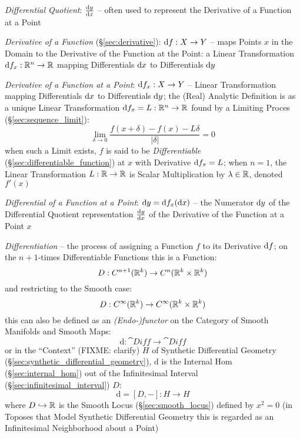 \emph{Differential Quotient}: $\frac{\mathrm{d}y}{\mathrm{d}x}$ -- often used to represent the
Derivative of a Function at a Point

\emph{Derivative of a Function} (\S\ref{sec:derivative}): $\mathrm{d}f : X
\rightarrow Y$ -- maps Points $x$ in the Domain to the Derivative of the
Function at the Point: a Linear Transformation
$\mathrm{d}f_x : \mathbb{R}^n \rightarrow \mathbb{R}$ mapping Differentials $\mathrm{d}x$ to
Differentials $\mathrm{d}y$

\emph{Derivative of a Function at a Point}: $\mathrm{d}f_x : X \rightarrow Y$ --
Linear Transformation mapping Differentials $\mathrm{d}x$ to Differentials
$\mathrm{d}y$; the (Real) Analytic Definition is as a unique Linear Transformation
$\mathrm{d}f_x = L : \mathbb{R}^n \rightarrow \mathbb{R}$ found by a Limiting Proces
(\S\ref{sec:sequence_limit}):
\[
  \lim_{\delta\rightarrow0} \frac{f(x + \delta) - f(x) - L\delta}{|\delta|} = 0
\]
when such a Limit exists, $f$ is said to be \emph{Differentiable}
(\S\ref{sec:differentiable_function}) at $x$ with Derivative $\mathrm{d}f_x = L$;
when $n=1$, the Linear Transformation $L : \mathbb{R} \rightarrow \mathbb{R}$ is Scalar
Multiplication by $\lambda \in \mathbb{R}$, denoted $f'(x)$

\emph{Differential of a Function at a Point}:
$\mathrm{d}y = \mathrm{d}f_x(\mathrm{d}x)$ -- the Numerator $\mathrm{d}y$ of the
Differential Quotient representation $\frac{\mathrm{d}y}{\mathrm{d}x}$ of the Derivative of the
Function at a Point $x$

\emph{Differentiation} -- the process of assigning a Function $f$ to its
Derivative $\mathrm{d}f$; on the $n+1$-times Differentiable Functions this is a
Function:
\[
  D : C^{n+1}(\mathbb{R}^k) \rightarrow C^n(\mathbb{R}^k \times \mathbb{R}^k)
\]
and restricting to the Smooth case:
\[
  D : C^\infty(\mathbb{R}^k) \rightarrow C^\infty(\mathbb{R}^k \times \mathbb{R}^k)
\]
this can also be defined as an \emph{(Endo-)functor} on the Category of Smooth
Manifolds and Smooth Maps:
\[
  \mathrm{d} : \cat{Diff} \rightarrow \cat{Diff}
\]
or in the ``Context'' (FIXME: clarify) $H$ of Synthetic Differential Geometry
(\S\ref{sec:synthetic_differential_geometry}), $\mathrm{d}$ is the Internal Hom
(\S\ref{sec:internal_hom}) out of the Infinitesimal Interval
(\S\ref{sec:infinitesimal_interval}) $D$:
\[
  \mathrm{d} = [D,-] : H \rightarrow H
\]
where $D \hookrightarrow \mathbb{R}$ is the Smooth Locus (\S\ref{sec:smooth_locus})
defined by $x^2 = 0$ (in Toposes that Model Synthetic Differential Geometry this
is regarded as an Infinitesimal Neighborhood about a Point)



